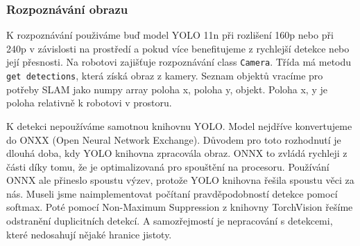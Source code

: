 \documentclass[a4paper,12pt]{article}
\begin{document}
\subsubsection{Rozpoznávání obrazu}
K rozpoznávání použiváme buď model YOLO 11n při rozlišení 160p nebo při 240p v závislosti na prostředí a pokud více benefitujeme z rychlejší detekce nebo její přesnosti.
Na robotovi zajišťuje rozpoznávání class \texttt{Camera}. Třída má metodu \texttt{get detections}, která získá obraz z kamery. 
Seznam objektů vracíme pro potřeby SLAM jako numpy array poloha x, poloha y, objekt. Poloha x, y je poloha relativně k robotovi v prostoru.

K detekci nepoužíváme samotnou knihovnu YOLO. Model nejdříve konvertujeme do ONXX (Open Neural Network Exchange). Důvodem pro toto rozhodnutí je dlouhá doba, kdy YOLO knihovna zpracovála obraz. ONNX to zvládá rychleji z části díky tomu, že je optimalizovaná pro spouštění na procesoru.
Používání ONNX ale přineslo spoustu výzev, protože YOLO knihovna řešila spoustu věci za nás. Museli jsme naimplementovat počítaní pravděpodobností detekce pomocí softmax. 
Poté pomocí Non-Maximum Suppression z knihovny TorchVision řešíme odstranění duplicitních detekcí. A samozřejmostí je nepracování s detekcemi, které nedosahují nějaké hranice jistoty.
\end{document}
